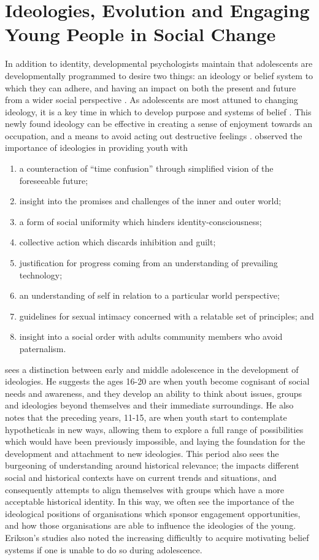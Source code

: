 \section{Ideologies, Evolution and Engaging Young People in Social Change}
In addition to identity, developmental psychologists maintain that adolescents are developmentally programmed to desire two things: an ideology or belief system to which they can adhere, and having an impact on both the present and future from a wider social perspective \citet{Juhasz1982}. As adolescents are most attuned to changing ideology, it is a key time in which to develop purpose and systems of belief \citep{Erikson1968}. This newly found ideology can be effective in creating a sense of enjoyment towards an occupation, and a means to avoid acting out destructive feelings \citep{Erikson1968}. \citet[][p187]{Erikson1968} observed the importance of ideologies in providing youth with 
\begin{enumerate}
 \item a counteraction of “time confusion” through simplified vision of the foreseeable future;
 \item insight into the promises and challenges of the inner and outer world;
 \item a form of social uniformity which hinders identity-consciousness;
 \item collective action which discards inhibition and guilt;
 \item justification for progress coming from an understanding of prevailing technology;
 \item an understanding of self in relation to a particular world perspective; 
 \item guidelines for sexual intimacy concerned with a relatable set of principles; and 
 \item insight into a social order with adults community members who avoid paternalism.
\end{enumerate} 

\citet{Erikson1968} sees a distinction between early and middle adolescence in the development of ideologies. He suggests the ages 16-20 are when youth become cognisant of social needs and awareness, and they develop an ability to think about issues, groups and ideologies beyond themselves and their immediate surroundings. He also notes that the preceding years, 11-15, are when youth start to contemplate hypotheticals in new ways, allowing them to explore a full range of possibilities which would have been previously impossible, and laying the foundation for the development and attachment to new ideologies. This period also sees the burgeoning of understanding around historical relevance; the impacts different social and historical contexts have on current trends and situations, and consequently attempts to align themselves with groups which have a more acceptable historical identity. In this way, we often see the importance of the ideological positions of organisations which sponsor engagement opportunities, and how those organisations are able to influence the ideologies of the young. Erikson's studies also noted the increasing difficultly to acquire motivating belief systems if one is unable to do so during adolescence. 

